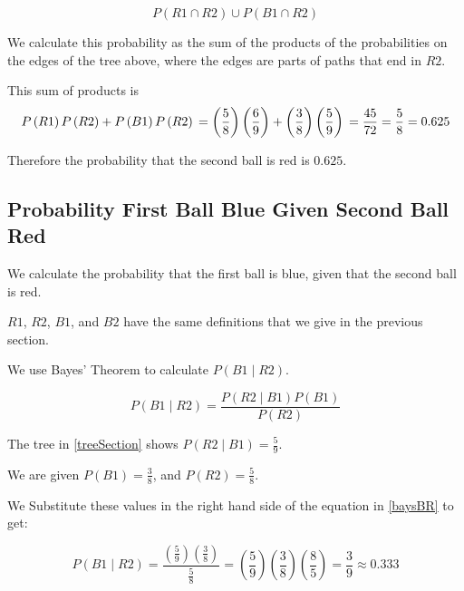 \documentclass[a4paper,11pt]{article}
\begin{document}
\begin{equation}
P\left( R1 \cap R2 \right) \cup P \left( B1 \cap R2 \right)
\end{equation}

We calculate this probability as the sum of the products of the
probabilities on the edges of the tree above, where the edges
are parts of paths that end in $R2$.

This sum of products is
\begin{equation}
  P \left( R1 \right) P\left( R2 \right) + 
    P \left( B1 \right) P \left( R2 \right) \\
   = \left( \frac{5}{8} \right)  \left( \frac{6}{9} \right) 
    + \left( \frac{3}{8} \right) \left( \frac{5}{9} \right) \\
  = \frac{45}{72} = \frac{5}{8} = 0.625
\end{equation}

Therefore the probability that the second ball is red is $0.625$.

\subsection{Probability First Ball Blue Given Second Ball Red}

We calculate the probability that the first ball is blue, given that
the second ball is red.

$R1$, $R2$, $B1$, and $B2$ have the same definitions that
we give in the previous section.

We use Bayes' Theorem \cite{reading3} to calculate
$P \left( B1 \mid R2 \right)$.

\begin{equation} \label{baysBR}
  P \left( B1 \mid R2 \right) = 
    \frac{ P \left( R2 \mid B1 \right) P\left( B1 \right) } 
      { P \left( R2 \right) }
\end{equation}

The tree in \ref{treeSection} shows 
$P\left( R2 \mid B1 \right) = \frac{5}{9}$.

We are given $P \left( B1 \right) = \frac{3}{8}$, and
$P \left( R2 \right) = \frac{5}{8}$.

We Substitute these values in the right hand side of the 
equation in \ref{baysBR} to get:

\begin{equation}
  P \left( B1 \mid R2 \right) 
  = \frac { \left( \frac{5}{9} \right) \left( \frac{3}{8} \right) }
      {\frac{5}{8}}
  = \left( \frac{5}{9} \right) \left( \frac{3}{8} \right) 
    \left( \frac{8}{5} \right) 
  = \frac{3}{9} \approx 0.333
\end{equation}


\printbibliography{}
\end{document}
